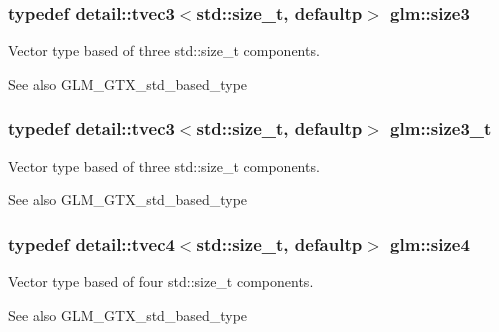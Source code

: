 \subsubsection[{\texorpdfstring{size3}{size3}}]{\setlength{\rightskip}{0pt plus 5cm}typedef detail\+::tvec3$<$std\+::size\+\_\+t, defaultp$>$ {\bf glm\+::size3}}\hypertarget{group__gtx__std__based__type_gae1dda4cdccd4c1abeeb2e470c048d0c9}{}\label{group__gtx__std__based__type_gae1dda4cdccd4c1abeeb2e470c048d0c9}
Vector type based of three std\+::size\+\_\+t components. \begin{DoxySeeAlso}{See also}
G\+L\+M\+\_\+\+G\+T\+X\+\_\+std\+\_\+based\+\_\+type 
\end{DoxySeeAlso}
\subsubsection[{\texorpdfstring{size3\+\_\+t}{size3_t}}]{\setlength{\rightskip}{0pt plus 5cm}typedef detail\+::tvec3$<$std\+::size\+\_\+t, defaultp$>$ {\bf glm\+::size3\+\_\+t}}\hypertarget{group__gtx__std__based__type_gad9ddaab6dd4c37ba46b74a1423ef2ba3}{}\label{group__gtx__std__based__type_gad9ddaab6dd4c37ba46b74a1423ef2ba3}
Vector type based of three std\+::size\+\_\+t components. \begin{DoxySeeAlso}{See also}
G\+L\+M\+\_\+\+G\+T\+X\+\_\+std\+\_\+based\+\_\+type 
\end{DoxySeeAlso}
\subsubsection[{\texorpdfstring{size4}{size4}}]{\setlength{\rightskip}{0pt plus 5cm}typedef detail\+::tvec4$<$std\+::size\+\_\+t, defaultp$>$ {\bf glm\+::size4}}\hypertarget{group__gtx__std__based__type_gac04a40cfe44b5035770cf26d98a9349d}{}\label{group__gtx__std__based__type_gac04a40cfe44b5035770cf26d98a9349d}
Vector type based of four std\+::size\+\_\+t components. \begin{DoxySeeAlso}{See also}
G\+L\+M\+\_\+\+G\+T\+X\+\_\+std\+\_\+based\+\_\+type 
\end{DoxySeeAlso}
